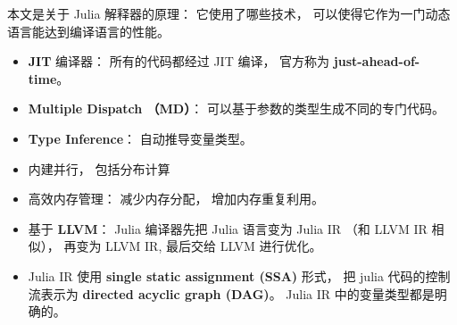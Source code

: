 
\begin{issues}
\issueDraft
\end{issues}

本文是关于 Julia 解释器的原理： 它使用了哪些技术， 可以使得它作为一门动态语言能达到编译语言的性能。

\begin{itemize}
\item \textbf{JIT} 编译器： 所有的代码都经过 JIT 编译， 官方称为 \textbf{just-ahead-of-time}。
\item \textbf{Multiple Dispatch （MD）}： 可以基于参数的类型生成不同的专门代码。
\item \textbf{Type Inference}： 自动推导变量类型。
\item 内建并行， 包括分布计算
\item 高效内存管理： 减少内存分配， 增加内存重复利用。
\item 基于 \textbf{LLVM}： Julia 编译器先把 Julia 语言变为 Julia IR （和 LLVM IR 相似）， 再变为 LLVM IR, 最后交给 LLVM 进行优化。
\item Julia IR 使用 \textbf{single static assignment (SSA)} 形式， 把 julia 代码的控制流表示为 \textbf{directed acyclic graph (DAG)}。 Julia IR 中的变量类型都是明确的。
\end{itemize}
